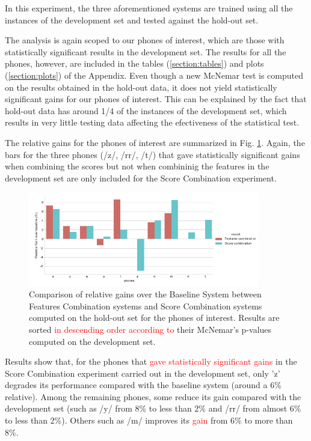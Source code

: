 In this experiment, the three aforementioned systems are trained using all the instances of the
development set and tested against the hold-out set.

The analysis is again scoped to our phones of interest, which are those with statistically
significant results in the development set.
The results for all the phones, however, are included in the tables
(\ref{section:tables}) and plots (\ref{section:plots})
of the Appendix.
Even though a new McNemar test is computed on the
results obtained in the hold-out data, it does not yield statistically significant gains
for our phones of interest. This can be explained by the fact that hold-out data
has around 1/4 of the instances of the
development set, which results in very little testing data
affecting the efectiveness of the statistical test.

The relative gains for the phones of interest are summarized in Fig. \ref{fig:fusionMcnemarTest}.
Again, the bars for the three phones (/z/, /rr/, /t/) that gave statistically significant
gains when combining the scores but not when combininig the features in the development
set are only included for the Score Combination experiment.

\begin{figure}[H]
	\centering
	\includegraphics[width=0.9\textwidth]{files/figures/results/relatives/relative-fusion-systems-heldout-mcnemar.png}
	\caption{Comparison of relative gains over the Baseline System
	between Features Combination systems and Score Combination
	systems computed on the hold-out set for the phones of interest.
	Results are sorted
	\textcolor{red}{in descending order according to} their McNemar's p-values computed on the development set.}
	\label{fig:fusionMcnemarTest}
\end{figure}

Results show that, for the phones that \textcolor{red}{gave statistically significant gains}
in the Score Combination
experiment carried out in the development set, only 'z' degrades its performance compared
with the baseline system (around a 6\% relative). Among the
remaining phones, some reduce its gain compared with the development set (such as
/y/ from 8\% to less than 2\% and /rr/ from almost 6\% to less than 2\%). Others such
as /m/ improves its \textcolor{red}{gain} from 6\% to more than 8\%.

